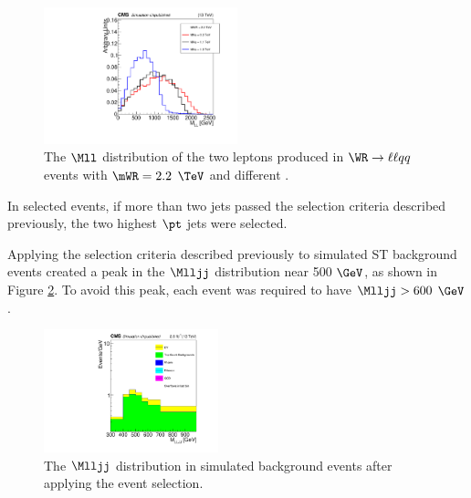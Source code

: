 \begin{figure}[h]
	\centering
	\includegraphics[width=0.5\textwidth]{figures/dileptonMassFromGenLeptonsFromFstAndScdHvyPtcl_MWR_2200_several_MNu_private.pdf}
	\caption{The $\Mll$ distribution of the two leptons produced in $\WR \rightarrow \ell\ell qq$ events with $\mWR = 2.2$ $\TeV$ and 
	different \mnul.}
	\label{fig:wrMllVarMNu}
\end{figure}
\clearpage

In selected events, if more than two jets passed the selection criteria described previously, the two highest $\pt$ jets were selected.

Applying the selection criteria described previously to simulated ST background events created a peak in the $\Mlljj$ distribution 
near 500 $\GeV$, as shown in Figure \ref{fig:sculptedMlljj}.  To avoid this peak, each event was required to have $\Mlljj > 600$ $\GeV$.

\begin{figure}[h]
	\centering
	\includegraphics[width=0.45\textwidth]{figures/Mlljj_varBins_SignalRegion_EEChannelBkgndMC_DYMadHTAndIncl_TTBarFromData_log.pdf}
	\caption{The $\Mlljj$ distribution in simulated background events after applying the event selection.}
	\label{fig:sculptedMlljj}
\end{figure}
\clearpage

